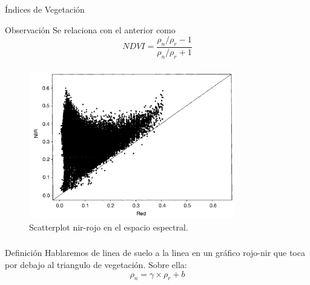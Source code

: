 \documentclass[]{beamer}
\begin{document}
\begin{frame}{Índices de Vegetación}
  \begin{block}{Observación}
    Se relaciona con el anterior como $$NDVI = \frac{\rho_n/\rho_r-1}{\rho_n/\rho_r+1}$$
  \end{block}
\end{frame}

\begin{frame}
    \frametitle{\subsecname}
    \begin{figure}
    \begin{center}
        \includegraphics[width=0.8\textwidth]{imagenes/scatter82.png}
    \end{center}
        \caption{Scatterplot nir-rojo en el espacio espectral. }
    \end{figure}
\end{frame}

\begin{frame}
    \frametitle{\subsecname}
     \begin{block}{Definición}
        Hablaremos de linea de suelo a la linea en un gráfico rojo-nir que toca
        por debajo al triangulo de vegetación. Sobre ella:
         \begin{equation}
             \rho_n = \gamma \times \rho_r +b
         \end{equation}
     \end{block}
\end{frame}
\end{document}

